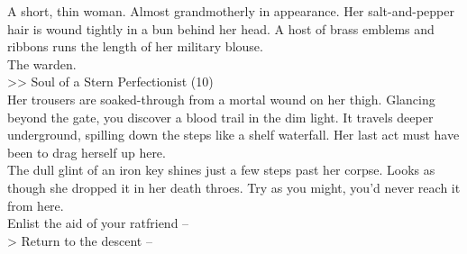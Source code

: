 A short, thin woman. Almost grandmotherly in appearance. Her salt-and-pepper hair is wound tightly in a bun behind her head. A host of brass emblems and ribbons runs the length of her military blouse.\\

The warden.\\
>> Soul of a Stern Perfectionist (10)\\

Her trousers are soaked-through from a mortal wound on her thigh. Glancing beyond the gate, you discover a blood trail in the dim light. It travels deeper underground, spilling down the steps like a shelf waterfall. Her last act must have been to drag herself up here.\\

The dull glint of an iron key shines just a few steps past her corpse. Looks as though she dropped it in her death throes. Try as you might, you’d never reach it from here.\\

 Enlist the aid of your ratfriend -- \\
> Return to the descent -- 